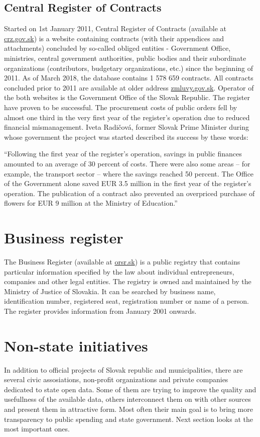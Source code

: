 \documentclass[thesis=B,english]{FITthesis}[2012/06/26]
\begin{document}
    \subsection{Central Register of Contracts}
    \label{crz}
    	Started on 1st January 2011, Central Register of Contracts (available at \href{https://www.crz.gov.sk}{crz.gov.sk}) is a website containing contracts (with their appendices and  attachments) concluded by so-called obliged entities - Government Office, ministries, central government authorities, public bodies and their subordinate organizations (contributors, budgetary organizations, etc.) since the beginning of 2011. As of March 2018, the database contains 1 578 659 contracts. All contracts concluded prior to 2011 are available at older address \href{http://www.zmluvy.gov.sk}{zmluvy.gov.sk}. Operator of the both websites is the Government Office of the Slovak Republic. The register have proven to be successful. The procurement costs of public orders fell by almost one third in the very first year of the register’s operation due to reduced financial mismanagement. Iveta Radičová, former Slovak Prime Minister during whose government the project was started described its success by these words:
\begin{displayquote}“Following the first year of the register’s operation, savings in public finances amounted to an average of 30 percent of costs. There were also some areas – for example, the transport sector – where the savings reached 50 percent. The Office of the Government alone saved EUR 3.5 million in the first year of the register’s operation. The publication of a contract also prevented an overpriced purchase of flowers for EUR 9 million at the Ministry of Education.”
\end{displayquote} \cite{joinupcrz}
    \section{Business register}   
     The Business Register (available at \href{http://www.orsr.sk}{orsr.sk}) is a public registry that contains particular information specified by the law about individual entrepreneurs, companies and other legal entities. The registry is owned and maintained by the Ministry of Justice of Slovakia. It can be searched by business name, identification number, registered seat, registration number or name of a person. The register provides information from January 2001 onwards.

	\section{Non-state initiatives}
	In addition to official projects of Slovak republic and municipalities, there are several civic assosiations, non-profit organizations and private companies dedicated to state open data. Some of them are trying to improve the quality and usefullness of the available data, others interconnect them on with other sources and present them in attractive form. Most often their main goal is to bring more transparency to public spending and state government. Next section looks at the most important ones.
\end{document}
